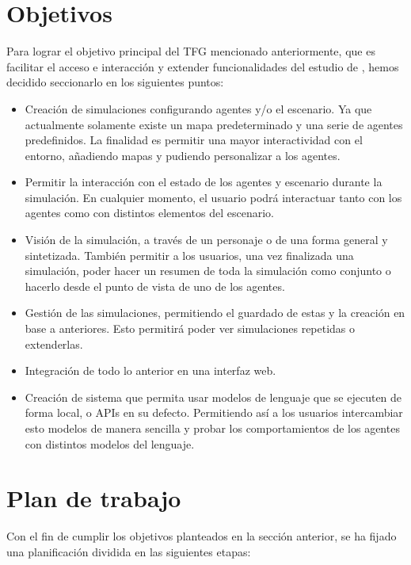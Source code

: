 \section{Objetivos}
Para lograr el objetivo principal del TFG mencionado anteriormente, que es facilitar el acceso e interacción y extender funcionalidades del estudio de  \ga, hemos decidido seccionarlo en los siguientes puntos:
\begin{itemize}
\item Creación de simulaciones configurando agentes y/o el escenario. Ya que actualmente solamente existe un mapa predeterminado y una serie de agentes predefinidos. La finalidad es permitir una mayor interactividad con el entorno, añadiendo mapas y pudiendo personalizar a los agentes.

\item Permitir la interacción con el estado de los agentes y escenario durante la simulación. En cualquier momento, el usuario podrá interactuar tanto con los agentes como con distintos elementos del escenario.

\item Visión de la simulación, a través de un personaje o de una forma general y sintetizada. También permitir a los usuarios, una vez finalizada una simulación, poder hacer un resumen de toda la simulación como conjunto o hacerlo desde el punto de vista de uno de los agentes.

\item Gestión de las simulaciones, permitiendo el guardado de estas y la creación en base a anteriores. Esto permitirá poder ver simulaciones repetidas o extenderlas.

\item Integración de todo lo anterior en una interfaz web.

\item Creación de sistema que permita usar modelos de lenguaje que se ejecuten de forma local, o APIs en su defecto. Permitiendo así a los usuarios intercambiar esto modelos de manera sencilla y probar los comportamientos de los agentes con distintos modelos del lenguaje.
\end{itemize}


\section{Plan de trabajo}
Con el fin de cumplir los objetivos planteados en la sección anterior, se ha fijado una planificación dividida en las siguientes etapas:

